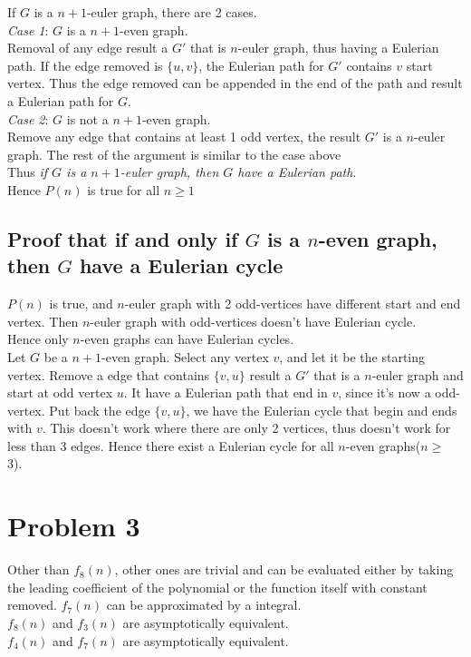\documentclass[letter]{article}
\begin{document}
If $G$ is a $n+1$-euler graph, there are 2 cases.\\
\emph{Case 1}: $G$ is a $n+1$-even graph.\\
Removal of any edge result a $G'$ that is $n$-euler graph, thus having a Eulerian path. If the edge removed is $\{u,v\}$, the Eulerian path for $G'$ contains $v$ start vertex. Thus the edge removed can be appended in the end of the path and result a Eulerian path for $G$.\\
\emph{Case 2}: $G$ is not a  $n+1$-even graph.\\
Remove any edge that contains at least 1 odd vertex, the result $G'$ is a $n$-euler graph. The rest of the argument is similar to the case above\\
Thus \emph{if $G$ is a $n+1$-euler graph, then $G$ have a Eulerian path}.\\

Hence $P(n)$ is true for all $n\geq 1$

\subsection*{Proof that if and only if $G$ is a $n$-even graph, then $G$ have a Eulerian cycle}
$P(n)$ is true, and $n$-euler graph with 2 odd-vertices have different start and end vertex. Then $n$-euler graph with odd-vertices doesn't have Eulerian cycle.\\
Hence only $n$-even graphs can have Eulerian cycles.\\
Let $G$ be a $n+1$-even graph. Select any vertex $v$, and let it be the starting vertex. Remove a edge that contains $\{v,u\}$ result a $G'$ that is a $n$-euler graph and start at odd vertex $u$. It have a Eulerian path that end in $v$, since it's now a odd-vertex. Put back the edge $\{v,u\}$, we have the Eulerian cycle that begin and ends with $v$. This doesn't work where there are only 2 vertices, thus doesn't work for less than 3 edges. 
Hence there exist a Eulerian cycle for all $n$-even graphs($n \geq$ 3).\\
\section*{Problem 3}
Other than $f_8(n)$, other ones are trivial and can be evaluated either by taking the leading coefficient of the polynomial or the function itself with constant removed. $f_7(n)$ can be approximated by a integral.\\
$f_8(n)$ and $f_3(n)$ are asymptotically equivalent.\\
$f_4(n)$ and $f_7(n)$ are asymptotically equivalent.\\
\end{document}
